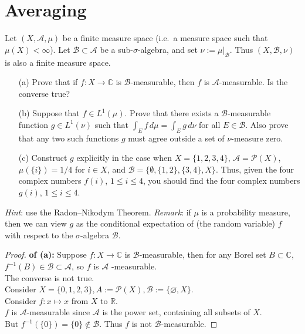 \documentclass[lang=cn,11pt]{elegantbook}
\begin{document}
\section{Averaging}
  Let $(X,\mathcal{A},\mu)$ be a finite measure space (i.e.\ a measure space such that $\mu(X)<\infty$). Let $\mathcal{B}\subset\mathcal{A}$ be a sub-$\sigma$-algebra, and set $\nu:=\mu|_\mathcal{B}$. Thus $(X,\mathcal{B},\nu)$ is also a finite measure space. 
  \begin{itemize}
  \item[(a)]   Prove that if $f\colon X\to\mathbb{C}$ is $\mathcal{B}$-measurable, then $f$ is $\mathcal{A}$-measurable. Is the converse true? 
  \item[(b)]    Suppose that $f\in L^1(\mu)$. Prove that there exists a $\mathcal{B}$-measurable function $g\in L^1(\nu)$ such that $\int_Ef\,d\mu=\int_Eg\,d\nu$ for all $E\in\mathcal{B}$. Also prove that any two such functions $g$ must agree outside a set of $\nu$-measure zero. 
  \item[(c)]Construct $g$ explicitly in the case when $X=\{1,2,3,4\}$, $\mathcal{A}=\mathcal{P}(X)$, $\mu(\{i\})=1/4$ for $i\in X$, and $\mathcal{B}=\{\emptyset,\{1,2\},\{3,4\},X\}$. 
    Thus, given the four complex numbers $f(i)$, $1\le i\le 4$, you should find the four complex numbers $g(i)$, $1\le i\le 4$. 
  \end{itemize}
 \textit{Hint}: use the Radon--Nikodym Theorem. 
 \textit{Remark}: if $\mu$ is a probability measure, then we can view $g$ as the conditional expectation of (the random variable) $f$ with respect to the $\sigma$-algebra $\mathcal{B}$. 


\begin{proof}
    \textbf{of (a):}
Suppose $f: X \rightarrow \mathbb{C}$ is $\mathcal{B}$-measurable, then for any Borel set $B \subset \mathbb{C}$, $f^{-1}(B) \in \mathcal{B} \subset \mathcal{A}$, so $f$ is $\mathcal{A}$ -measurable.\\
The converse is not true.\\
Consider $X = \{ 0,1,2,3 \}, A:= \mathcal{P}(X), \mathcal{B}:= \{\varnothing,X\}$.\\
Consider $f:x\mapsto x$ from $X$ to $\mathbb{R}$.\\
$f$ is $\mathcal{A}$-measurable since $\mathcal{A}$ is the power set, containing all subsets of $X$.\\
But $f^{-1}(\{0\}) = \{0\} \not \in \mathcal{B}$. Thus $f$ is not $\mathcal{B}$-measurable.
\end{proof}
\end{document}
